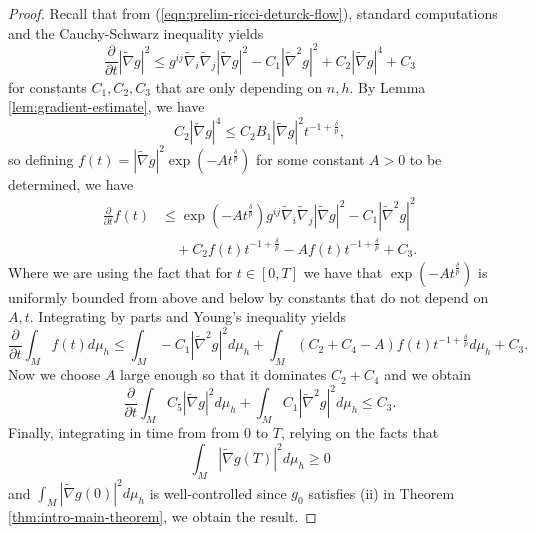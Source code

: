 \documentclass[12pt]{amsart}
\newcommand{\hdel}{\tilde{\nabla}}
\theoremstyle{remark}
\numberwithin{equation}{section}
\begin{document}
\begin{proof}
    Recall that from (\ref{eqn:prelim-ricci-deturck-flow}), standard computations and the Cauchy-Schwarz inequality yields
    \begin{equation*}
        \frac{\partial}{\partial t} |\hdel g|^2 \leq g^{ij}\hdel_i\hdel_j |\hdel g|^2 - C_1 |\hdel^2 g|^2 + C_2|\hdel g|^4 + C_3
    \end{equation*}
    for constants $C_1, C_2, C_3$ that are only depending on $n, h$. By Lemma \ref{lem:gradient-estimate}, we have
    \begin{equation*}
        C_2|\hdel g|^4 \leq C_2B_1|\hdel g|^2t^{-1+\frac{\delta}{p}},
    \end{equation*}
    so defining $f(t) = |\hdel g|^2\exp\left(-At^\frac{\delta}{p}\right)$ for some constant $A > 0$ to be determined, we have
    \begin{align*}
        \frac{\partial}{\partial t} f(t) &\leq \exp\left(-At^\frac{\delta}{p}\right)g^{ij}\hdel_i\hdel_j|\hdel g|^2 - C_1|\hdel^2 g|^2 \nonumber \\
        &\quad + C_2f(t)t^{-1+\frac{\delta}{p}} - Af(t)t^{-1+\frac{\delta}{p}} + C_3.
    \end{align*}
    Where we are using the fact that for $t \in [0, T]$ we have that $\exp\left(-At^\frac{\delta}{p}\right)$ is uniformly bounded from above and below by constants that do not depend on $A, t$. Integrating by parts and Young's inequality yields
    \begin{equation*}
        \frac{\partial}{\partial t} \int_M f(t)d\mu_h \leq \int_M -C_1|\hdel^2g|^2d\mu_h + \int_M\left(C_2+C_4-A\right)f(t)t^{-1+\frac{\delta}{p}}d\mu_h + C_3.
    \end{equation*}
    Now we choose $A$ large enough so that it dominates $C_2 + C_4$ and we obtain
    \begin{equation*}
        \frac{\partial}{\partial t} \int_M C_5|\hdel g|^2d\mu_h + \int_M C_1|\hdel^2 g|^2d\mu_h \leq C_3.
    \end{equation*}
    Finally, integrating in time from from $0$ to $T$, relying on the facts that 
    \begin{equation*}
        \int_M |\hdel g(T)|^2 d\mu_h \geq 0
    \end{equation*}
    and $\int_M |\hdel g(0)|^2 d\mu_h$ is well-controlled since $g_0$ satisfies (ii) in Theorem \ref{thm:intro-main-theorem}, we obtain the result.
\end{proof}
\end{document}
